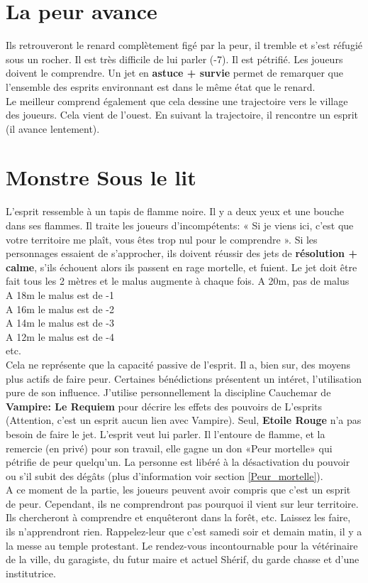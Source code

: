 \documentclass[oneside,12pt]{book}
\newcommand{\Lynn}{\textbf{Etoile Rouge} }
\begin{document}
\begin{flushleft}
\section{La peur avance}
Ils retrouveront le renard complètement figé par la peur, il tremble et s'est réfugié sous un rocher. Il est très difficile de lui parler (-7). Il est pétrifié. Les joueurs doivent le comprendre. Un jet en \textbf{astuce + survie} permet de remarquer que l’ensemble des esprits environnant est dans le même état que le renard.\\
Le meilleur comprend également que cela dessine une trajectoire vers le village des joueurs. Cela vient de l'ouest. En suivant la trajectoire, il rencontre un esprit (il avance lentement). 

\section{Monstre Sous le lit}
L'esprit ressemble à un tapis de flamme noire. Il y a deux yeux et une bouche dans ses flammes. Il traite les joueurs d'incompétents: « Si je viens ici, c'est que votre territoire me plaît, vous êtes trop nul pour le comprendre ».
Si les personnages essaient de s'approcher, ils doivent réussir des jets de \textbf{résolution + calme}, s'ils échouent alors ils passent en rage mortelle, et fuient. 
Le jet doit être fait tous les 2 mètres et le malus augmente à chaque fois. 
A 20m, pas de malus\\
A 18m le malus est de -1\\
A 16m le malus est de -2\\
A 14m le malus est de -3\\
A 12m le malus est de -4\\
etc.\\
Cela ne représente que la capacité passive de l'esprit. Il a, bien sur, des moyens plus actifs de faire peur. Certaines bénédictions présentent un intéret, l'utilisation pure de son influence. J'utilise personnellement la discipline Cauchemar de \textbf{Vampire: Le Requiem} pour décrire les effets des pouvoirs de L'esprits (Attention, c'est un esprit aucun lien avec Vampire).
Seul, \Lynn n'a pas besoin de faire le jet. L'esprit veut lui parler. 
Il l'entoure de flamme, et la remercie (en privé) pour son travail, elle gagne un don «Peur mortelle»  qui pétrifie de peur quelqu'un. La personne est libéré à la désactivation du pouvoir ou s'il subit des dégâts (plus d'information voir section \ref{Peur_mortelle}).\\
A ce moment de la partie, les joueurs peuvent avoir compris que c'est un esprit de peur. Cependant, ils ne comprendront pas pourquoi il vient sur leur territoire. Ils chercheront à comprendre et enquêteront dans la forêt, etc. Laissez les faire, ils n'apprendront rien. Rappelez-leur que c'est samedi soir et demain matin, il y a la messe au temple protestant. Le rendez-vous incontournable pour la vétérinaire de la ville, du garagiste, du futur maire et actuel Shérif, du garde chasse et d'une institutrice.\\  

\end{flushleft}
\end{document}
